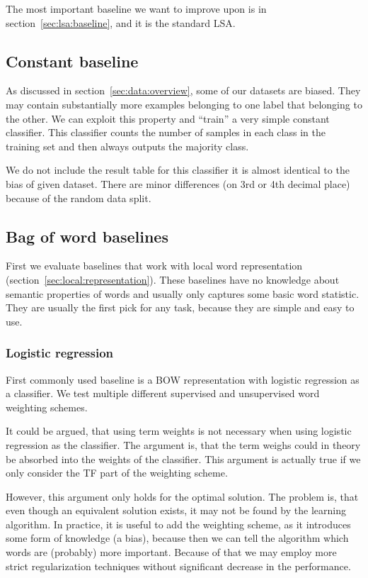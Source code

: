     The most important baseline we want to improve upon is in section~\ref{sec:lsa:baseline}, 
    and it is the standard LSA.

    \subsection{Constant baseline}
    
    As discussed in section~\ref{sec:data:overview}, some of our datasets are biased. 
    They may contain substantially more examples belonging to one label that belonging to the other.
    We can exploit this property and ``train'' a very simple constant classifier. 
    This classifier counts the number of samples in each class in the training set and then always outputs the majority class.
    
    We do not include the result table for this classifier it is almost identical to the bias of given dataset.
    There are minor differences (on 3rd or 4th decimal place) because of the random data split. 

    \subsection{Bag of word baselines}
    
    First we evaluate baselines that work with local word representation (section~\ref{sec:local:representation}).
    These baselines have no knowledge about semantic properties of words and usually only captures some basic word statistic.
    They are usually the first pick for any task, because they are simple and easy to use. 
    
    \subsubsection{Logistic regression}
    
    First commonly used baseline is a BOW representation with logistic regression as a classifier. 
    We test multiple different supervised and unsupervised word weighting schemes.
    
    It could be argued, that using term weights is not necessary when using logistic regression as the classifier.
    The argument is, that the term weighs could in theory be absorbed into the weights of the classifier. 
    This argument is actually true if we only consider the TF part of the weighting scheme.
    
    However, this argument only holds for the optimal solution. 
    The problem is, that even though an equivalent solution exists, it may not be found by the learning algorithm. 
    In practice, it is useful to add the weighting scheme, 
    as it introduces some form of knowledge (a bias), 
    because then we can tell the algorithm which words are (probably) more important.
    Because of that we may employ more strict regularization techniques without significant decrease in the performance.
    


